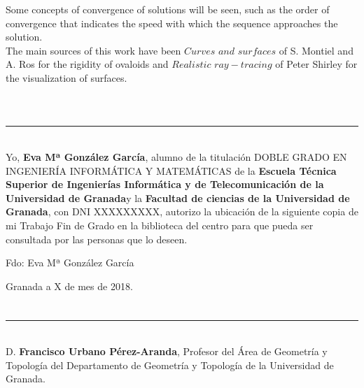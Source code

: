 Some concepts of convergence of solutions will be seen, such as the order of convergence that indicates the speed with which the sequence approaches the solution.
${ }$\\

The main sources of this work have been $Curves$ $and$ $surfaces$ of S. Montiel and A. Ros for the rigidity of ovaloids and $Realistic$ $ray-tracing$ of Peter Shirley for the visualization of surfaces.
${ }$\\


\vspace{0.7cm}
\\

\chapter*{}
\thispagestyle{empty}

\noindent\rule[-1ex]{\textwidth}{2pt}\\[4.5ex]

Yo, \textbf{Eva Mª González García}, alumno de la titulación DOBLE GRADO EN INGENIERÍA INFORMÁTICA Y MATEMÁTICAS de la \textbf{Escuela Técnica Superior
de Ingenierías Informática y de Telecomunicación de la Universidad de Granada}y la \textbf{Facultad de ciencias de la Universidad de Granada}, con DNI XXXXXXXXX, autorizo la
ubicación de la siguiente copia de mi Trabajo Fin de Grado en la biblioteca del centro para que pueda ser
consultada por las personas que lo deseen.

\vspace{6cm}

\noindent Fdo: Eva Mª González García

\vspace{2cm}

\begin{flushright}
Granada a X de mes de 2018.
\end{flushright}


\chapter*{}
\thispagestyle{empty}

\noindent\rule[-1ex]{\textwidth}{2pt}\\[4.5ex]

D. \textbf{Francisco Urbano Pérez-Aranda}, Profesor del Área de Geometría y Topología del Departamento de Geometría y Topología de la Universidad de Granada.

